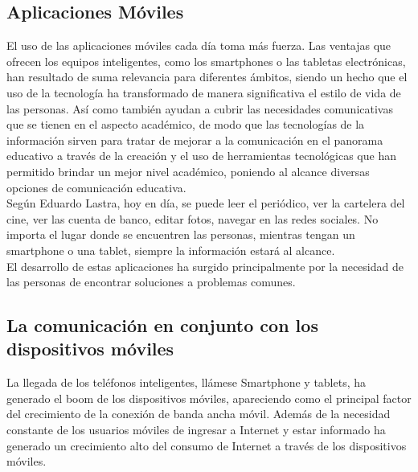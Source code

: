 	\subsection{Aplicaciones Móviles}
	
	El uso de las aplicaciones móviles cada día toma más fuerza. Las ventajas que ofrecen los equipos inteligentes, como los smartphones o las tabletas electrónicas, han resultado de suma relevancia para diferentes ámbitos, siendo un hecho que el uso de la tecnología ha transformado de manera significativa el estilo de vida de las personas. 
	Así como también ayudan a cubrir las necesidades comunicativas que se tienen en el aspecto académico, de modo que las tecnologías de la información sirven para tratar de mejorar a la comunicación en el panorama educativo a través de la creación y el uso de herramientas tecnológicas que han permitido brindar un mejor nivel académico, poniendo al alcance diversas opciones de comunicación educativa\cite{06}.\\
	
	Según Eduardo Lastra, hoy en día, se puede leer el periódico, ver la cartelera del cine, ver las cuenta de banco, editar fotos, navegar en las redes sociales. No importa el lugar donde se encuentren las personas, mientras tengan un smartphone o una tablet, siempre la información estará al alcance.\\
	El desarrollo de estas aplicaciones ha surgido principalmente por la necesidad de las personas de encontrar soluciones a problemas comunes\cite{07}.

	\subsection{La comunicación en conjunto con los dispositivos móviles}
	La llegada de los teléfonos inteligentes, llámese Smartphone y tablets, ha generado el boom de los dispositivos móviles, apareciendo como el principal factor del crecimiento de la conexión de banda ancha móvil. Además de la necesidad constante de los usuarios móviles de ingresar a Internet y estar informado ha generado un crecimiento alto del consumo de Internet a través de los dispositivos móviles\cite{09}.
